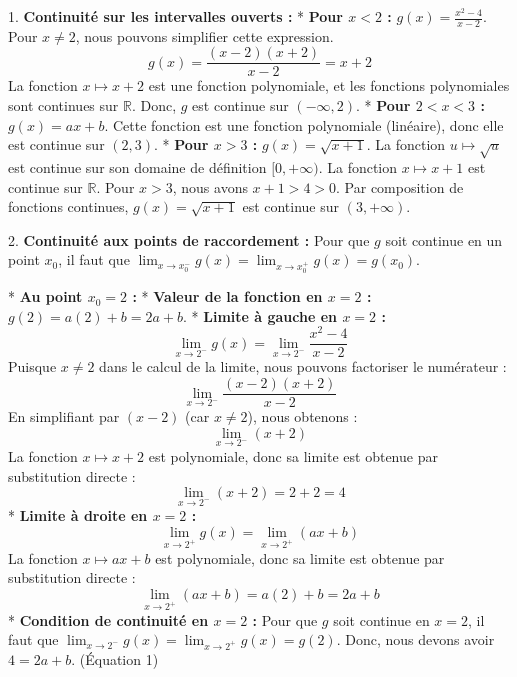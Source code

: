 \documentclass[12pt,a4paper]{report}
\begin{document}
1.  \textbf{Continuité sur les intervalles ouverts :}
    *   \textbf{Pour $x < 2$ :} $g(x) = \frac{x^2 - 4}{x - 2}$. Pour $x \ne 2$, nous pouvons simplifier cette expression.
        $$ g(x) = \frac{(x - 2)(x + 2)}{x - 2} = x + 2 $$
        La fonction $x \mapsto x+2$ est une fonction polynomiale, et les fonctions polynomiales sont continues sur $\mathbb{R}$. Donc, $g$ est continue sur $(-\infty, 2)$.
    *   \textbf{Pour $2 < x < 3$ :} $g(x) = ax + b$. Cette fonction est une fonction polynomiale (linéaire), donc elle est continue sur $(2, 3)$.
    *   \textbf{Pour $x > 3$ :} $g(x) = \sqrt{x + 1}$. La fonction $u \mapsto \sqrt{u}$ est continue sur son domaine de définition $[0, +\infty)$. La fonction $x \mapsto x+1$ est continue sur $\mathbb{R}$. Pour $x > 3$, nous avons $x+1 > 4 > 0$. Par composition de fonctions continues, $g(x) = \sqrt{x+1}$ est continue sur $(3, +\infty)$.

2.  \textbf{Continuité aux points de raccordement :}
    Pour que $g$ soit continue en un point $x_0$, il faut que $\lim_{x \to x_0^-} g(x) = \lim_{x \to x_0^+} g(x) = g(x_0)$.

    *   \textbf{Au point $x_0 = 2$ :}
        *   \textbf{Valeur de la fonction en $x=2$ :} $g(2) = a(2) + b = 2a + b$.
        *   \textbf{Limite à gauche en $x=2$ :}
            $$ \lim_{x \to 2^-} g(x) = \lim_{x \to 2^-} \frac{x^2 - 4}{x - 2} $$
            Puisque $x \ne 2$ dans le calcul de la limite, nous pouvons factoriser le numérateur :
            $$ \lim_{x \to 2^-} \frac{(x - 2)(x + 2)}{x - 2} $$
            En simplifiant par $(x-2)$ (car $x \ne 2$), nous obtenons :
            $$ \lim_{x \to 2^-} (x + 2) $$
            La fonction $x \mapsto x+2$ est polynomiale, donc sa limite est obtenue par substitution directe :
            $$ \lim_{x \to 2^-} (x + 2) = 2 + 2 = 4 $$
        *   \textbf{Limite à droite en $x=2$ :}
            $$ \lim_{x \to 2^+} g(x) = \lim_{x \to 2^+} (ax + b) $$
            La fonction $x \mapsto ax+b$ est polynomiale, donc sa limite est obtenue par substitution directe :
            $$ \lim_{x \to 2^+} (ax + b) = a(2) + b = 2a + b $$
        *   \textbf{Condition de continuité en $x=2$ :} Pour que $g$ soit continue en $x=2$, il faut que $\lim_{x \to 2^-} g(x) = \lim_{x \to 2^+} g(x) = g(2)$.
            Donc, nous devons avoir $4 = 2a + b$. (Équation 1)
\end{document}
